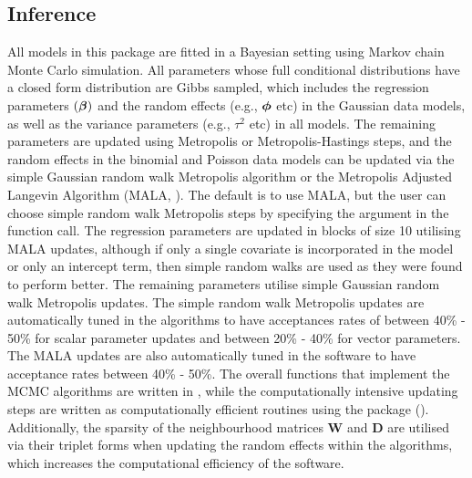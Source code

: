 \documentclass[article, nojss]{jss}
\newcommand{\bd}[1]{\ensuremath{\mbox{\boldmath $#1$}}}
\begin{document}
\subsection{Inference}
All models in this package are fitted in a Bayesian setting using Markov chain Monte Carlo simulation. All parameters whose full conditional distributions have a closed form distribution are Gibbs sampled, which includes the regression parameters $(\bd{\beta})$ and the random effects (e.g., $\bd{\phi}$ etc) in the Gaussian data models, as well as the variance parameters (e.g., $\tau^2$ etc) in all models. The remaining parameters are updated using Metropolis or Metropolis-Hastings steps, and the random effects in the binomial and Poisson data models can be updated via the simple Gaussian random walk Metropolis algorithm or the Metropolis Adjusted Langevin Algorithm (MALA, \citealp{roberts1998}). The default is to use MALA, but the user can choose simple random walk Metropolis steps by specifying the  argument in the function call. The regression parameters are updated in blocks of size 10 utilising MALA updates, although if only a single covariate is incorporated in the model or only an intercept term, then simple random walks are used as they were found to perform better. The remaining parameters utilise simple Gaussian random walk Metropolis updates. The simple random walk Metropolis updates are automatically tuned in the algorithms to have acceptances rates of between 40\% - 50\% for scalar parameter updates and between 20\% - 40\% for vector parameters. The MALA updates are also automatically tuned in the software to have acceptance rates between 40\% - 50\%. The overall functions that implement the MCMC algorithms are written in , while the computationally intensive updating steps are written as computationally efficient   routines using the  package  (\citealp{eddelbuettel2011}). Additionally, the sparsity of the neighbourhood matrices $\mathbf{W}$ and $\mathbf{D}$ are utilised via their triplet forms when updating the random effects  within the algorithms, which increases the computational efficiency of the software.\\ 
\end{document}
